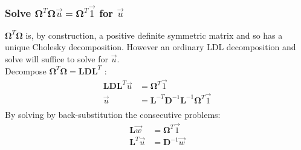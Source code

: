 \documentclass{article}
\def\mat#1{\mathbf{#1}}
\begin{document}
\subsubsection{Solve $\mat{\Omega}^T \mat{\Omega} \vec{u} = \mat{\Omega}^T \vec{1}$ for $\vec{u}$}
$\mat{\Omega}^T\mat{\Omega}$ is, by construction, a positive definite symmetric
matrix and so has a unique Cholesky decomposition. However an ordinary LDL
decomposition and solve will suffice to solve for $\vec{u}$.\\
Decompose $\mat{\Omega}^T \mat{\Omega} = \mat{L}\mat{D}\mat{L}^T $ :
\begin{equation}
\begin{split}
\mat{L}\mat{D}\mat{L}^T \vec{u} &= \mat{\Omega}^T \vec{1}\\
\vec{u} &= \mat{L}^{-T}\mat{D}^{-1}\mat{L}^{-1}\mat{\Omega}^T \vec{1}\\
\end{split}
\end{equation}
By solving by back-substitution the consecutive problems:
\begin{equation}
\begin{split}
\mat{L}\vec{w} &= \mat{\Omega}^T \vec{1}\\
\mat{L}^T\vec{u} &= \mat{D}^{-1} \vec{w}\\
\end{split}
\end{equation}
\end{document}
